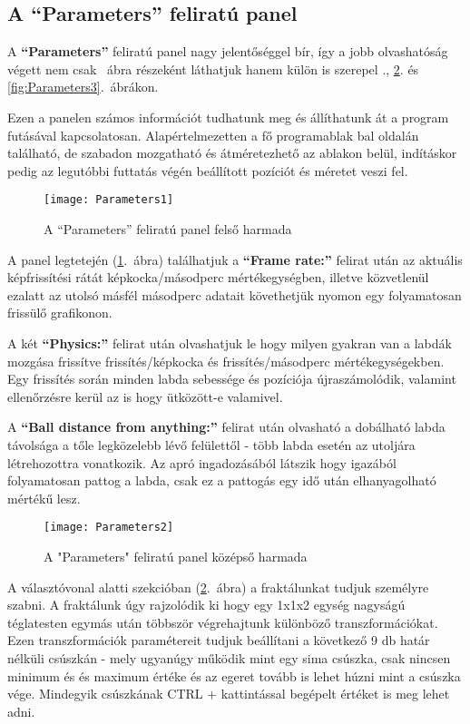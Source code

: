 \subsection{A ``Parameters'' feliratú panel}

A \textbf{``Parameters''} feliratú panel nagy jelentőséggel bír, így a jobb olvashatóság végett nem csak ~ábra részeként láthatjuk hanem külön is szerepel ., \ref{fig:Parameters2}. és \ref{fig:Parameters3}.~ábrákon.

Ezen a panelen számos információt tudhatunk meg és állíthatunk át a program futásával kapcsolatosan. Alapértelmezetten a fő programablak bal oldalán található, de szabadon mozgatható és átméretezhető az ablakon belül, indításkor pedig az legutóbbi futtatás végén beállított pozíciót és méretet veszi fel. 

\begin{figure}[H]
	\centering
	\texttt{[image: Parameters1]}
	\caption{A ``Parameters'' feliratú panel felső harmada}
	\label{fig:Parameters1}
\end{figure}

A panel legtetején (\ref{fig:Parameters1}.~ábra) találhatjuk a \textbf{``Frame rate:''} felirat után az aktuális képfrissítési rátát képkocka/másodperc mértékegységben, illetve közvetlenül ezalatt az utolsó másfél másodperc adatait követhetjük nyomon egy folyamatosan frissülő grafikonon. 

A két \textbf{``Physics:''} felirat után olvashatjuk le hogy milyen gyakran van a labdák mozgása frissítve frissítés/képkocka és frissítés/másodperc mértékegységekben. Egy frissítés során minden labda sebessége és pozíciója újraszámolódik, valamint ellenőrzésre kerül az is hogy ütközött-e valamivel. 

A \textbf{``Ball distance from anything:''} felirat után olvasható a dobálható labda távolsága a tőle legközelebb lévő felülettől - több labda esetén az utoljára létrehozottra vonatkozik. Az apró ingadozásából látszik hogy igazából folyamatosan pattog a labda, csak ez a pattogás egy idő után elhanyagolható mértékű lesz.

\begin{figure}[H]
	\centering
	\texttt{[image: Parameters2]}
	\caption{A "Parameters" feliratú panel középső harmada}
	\label{fig:Parameters2}
\end{figure}

A választóvonal alatti szekcióban (\ref{fig:Parameters2}.~ábra) a fraktálunkat tudjuk személyre szabni. A fraktálunk úgy rajzolódik ki hogy egy 1x1x2 egység nagyságú téglatesten egymás után többször végrehajtunk különböző transzformációkat. Ezen transzformációk paramétereit tudjuk beállítani a következő 9 db határ nélküli csúszkán - mely ugyanúgy működik mint egy sima csúszka, csak nincsen minimum és és maximum értéke és az egeret tovább is lehet húzni mint a csúszka vége. Mindegyik csúszkának CTRL + kattintással begépelt értéket is meg lehet adni. 

